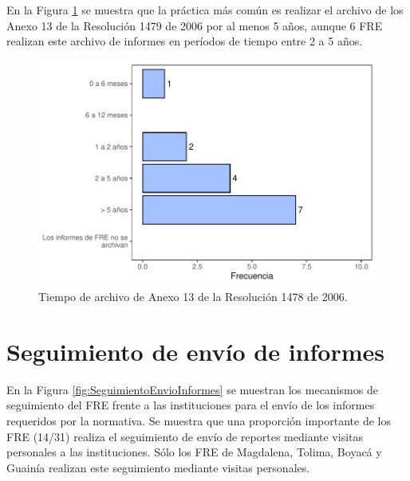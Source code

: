 \documentclass[
]{book}
\begin{document}
En la Figura \ref{fig:ArchivoInformesFRE} se muestra que la práctica más común es realizar el archivo de los Anexo 13 de la Resolución 1479 de 2006 por al menos 5 años, aunque 6 FRE realizan este archivo de informes en períodos de tiempo entre 2 a 5 años.

\begin{figure}[b!]

{\centering \includegraphics[width=0.95\linewidth]{InformeFinal_files/figure-latex/ArchivoInformesFRE-1} 

}

\caption{Tiempo de archivo de Anexo 13 de la Resolución 1478 de 2006.}\label{fig:ArchivoInformesFRE}
\end{figure}

\hypertarget{seguimiento-de-envuxedo-de-informes}{%
\section{Seguimiento de envío de informes}\label{seguimiento-de-envuxedo-de-informes}}

En la Figura \ref{fig:SeguimientoEnvioInformes} se muestran los mecanismos de seguimiento del FRE frente a las instituciones para el envío de los informes requeridos por la normativa. Se muestra que una proporción importante de los FRE (14/31) realiza el seguimiento de envío de reportes mediante visitas personales a las instituciones. Sólo los FRE de Magdalena, Tolima, Boyacá y Guainía realizan este seguimiento mediante visitas personales.
\end{document}
